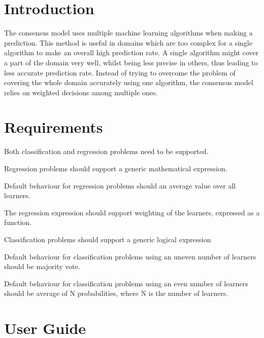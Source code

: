 \documentclass[12pt]{article}
\begin{document}
\maketitle

\newpage

\section{Introduction}

The consensus model uses multiple machine learning algorithms when making a prediction.
This method is useful in domains which are too complex for a single
algorithm to make an overall high prediction rate. A single algorithm might cover a part
of the domain very well, whilst being less precise in others, thus leading to less accurate
prediction rate. Instead of trying to overcome the problem of covering the whole domain
accurately using one algorithm, the consensus model relies on weighted decisions among
multiple ones. 

\section{Requirements}

\begin{list}{*}{}
\item Both classification and regression problems need to be supported.
\item Regression problems should support a generic mathematical expression.
\item Default behaviour for regression problems should an average value over all learners.
\item The regression expression should support weighting of the learners, expressed as a function.
\item Classification problems should support a generic logical expression
\item Default behaviour for classification problems using an uneven number of learners 
  should be majority vote.
\item Default behaviour for classification problems using an even number of learners
  should be average of N probabilities, where N is the number of learners.
\end{list}

\newpage
\section{User Guide}\label{user}
\end{document}
